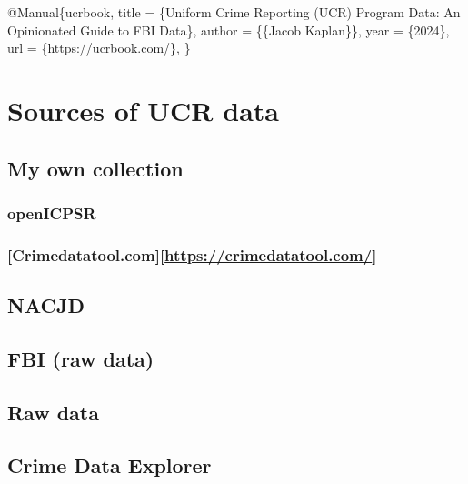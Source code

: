\documentclass[
]{krantz}
\makeatletter
\newenvironment{Shaded}{\begin{snugshade}}{\end{snugshade}}
\newcommand{\DataTypeTok}[1]{\textcolor[rgb]{0.27,0.27,0.27}{#1}}
\newcommand{\NormalTok}[1]{#1}
\newcommand{\OtherTok}[1]{\textcolor[rgb]{0.37,0.37,0.37}{#1}}
\newcommand{\VariableTok}[1]{\textcolor[rgb]{0,0,0}{#1}}
\newenvironment{kframe}{%
\medskip{}
\setlength{\fboxsep}{.8em}
 \def\at@end@of@kframe{}%
 \ifinner\ifhmode%
  \def\at@end@of@kframe{\end{minipage}}%
  \begin{minipage}{\columnwidth}%
 \fi\fi%
 \def\FrameCommand##1{\hskip\@totalleftmargin \hskip-\fboxsep
 \colorbox{shadecolor}{##1}\hskip-\fboxsep
     \hskip-\linewidth \hskip-\@totalleftmargin \hskip\columnwidth}%
 \MakeFramed {\advance\hsize-\width
   \@totalleftmargin\z@ \linewidth\hsize
   \@setminipage}}%
 {\par\unskip\endMakeFramed%
 \at@end@of@kframe}
\renewenvironment{Shaded}{\begin{kframe}}{\end{kframe}}
\makeatother
\begin{document}
\begin{Shaded}
\begin{Highlighting}[]
\VariableTok{@Manual}\NormalTok{\{}\OtherTok{ucrbook}\NormalTok{,}
  \DataTypeTok{title}\NormalTok{ = \{Uniform Crime Reporting (UCR) Program Data: An Opinionated Guide to FBI Data\},}
  \DataTypeTok{author}\NormalTok{ = \{\{Jacob Kaplan\}\},}
  \DataTypeTok{year}\NormalTok{ = \{2024\},}
  \DataTypeTok{url}\NormalTok{ = \{https://ucrbook.com/\},}
\NormalTok{\}}
\end{Highlighting}
\end{Shaded}

\section{Sources of UCR data}\label{sources-of-ucr-data}

\subsection{My own collection}\label{my-own-collection}

\subsubsection{openICPSR}\label{openicpsr}

\subsubsection{\texorpdfstring{{[}Crimedatatool.com{]}{[}\url{https://crimedatatool.com/}{]}}{{[}Crimedatatool.com{]}{[}https://crimedatatool.com/{]}}}\label{crimedatatool.comhttpscrimedatatool.com}

\subsection{NACJD}\label{nacjd}

\subsection{FBI (raw data)}\label{fbi-raw-data}

\subsection{Raw data}\label{raw-data}

\subsection{Crime Data Explorer}\label{crime-data-explorer}
\end{document}
